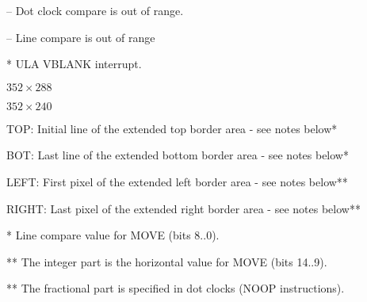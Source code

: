 \documentclass[11pt]{book}
\def\lthtmlcheckvsize{\ifdim\ht\sizebox<\vsize 
  \ifdim\wd\sizebox<\hsize\expandafter\hfill\fi \expandafter\vfill
  \else\expandafter\vss\fi}%
\begin{document}
{\newpage\clearpage
{}%
\begin{table}\centering
  
\end{table}%
\lthtmlfigureZ
\lthtmlcheckvsize\clearpage}

{\newpage\clearpage
{}%
\begin{table}\centering
  
\par
\raggedright -- Dot clock compare is out of range.
\end{table}%
\lthtmlfigureZ
\lthtmlcheckvsize\clearpage}

{\newpage\clearpage
{}%
\begin{table}\centering\tiny
  
\par
\raggedright -- Line compare is out of range
\par
* ULA VBLANK interrupt.
\end{table}%
\lthtmlfigureZ
\lthtmlcheckvsize\clearpage}

{\newpage\clearpage
{}%
$352\times288$%
\lthtmlindisplaymathZ
\lthtmlcheckvsize\clearpage}

{\newpage\clearpage
{}%
$352\times240$%
\lthtmlindisplaymathZ
\lthtmlcheckvsize\clearpage}

{\newpage\clearpage
{}%
\begin{table}\centering
  
\end{table}%
\lthtmlfigureZ
\lthtmlcheckvsize\clearpage}

{\newpage\clearpage
{}%
\begin{table}\centering\small
  
\par
\raggedright TOP: Initial line of the extended top border area - see notes below*
\par
BOT: Last line of the extended bottom border area - see notes below*
\par
LEFT: First pixel of the extended left border area - see notes below**
\par
RIGHT: Last pixel of the extended right border area - see notes below**
\par
* Line compare value for MOVE (bits 8..0).
\par
** The integer part is the horizontal value for MOVE (bits 14..9).
\par
** The fractional part is specified in dot clocks (NOOP instructions).
\end{table}%
\lthtmlfigureZ
\lthtmlcheckvsize\clearpage}
\end{document}
